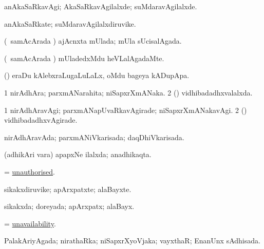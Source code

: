 \bentry
{} 
\gl{\kirxvi}
\expl{}
\bmng
anAkaSaRkavAgi; AkaSaRkavAgilalxde; suMdaravAgilalxde. 
\emng
\eentry

\bentry
{} 
\gl{\nA}
\expl{}
\bmng
anAkaSaRkate; suMdaravAgilalxdiruvike. 
\emng
\eentry

\bentry
{} 
\gl{\gu}
\expl{}
\bmng
(\kanmu\ samAcArada \vi) ajAcnxta mUlada; mUla sUcisalAgada. 
\emng
\eentry

\bentry
{} 
\gl{\kirxvi}
\expl{}
\bmng
(\kanmu\ samAcArada \vi) mUladedxMdu heVLalAgadaMte. 
\emng
\eentry

\bentry
{} 
\gl{\nA}
\expl{}
\bmng
(\pArxvi) eraDu kAlebxraLugaLuLaLx, oMdu bageya kADupApa. 
\emng
\eentry

\bentry
{} 
\gl{\gu}
\expl{}
\bmng
\bnum
\num{1} nirAdhAra; parxmANarahita; niSapxrXmANaka. 
\num{2} (\nAyxshA) vidhibadadhxvalalxda. 
\enum
\emng
\eentry

\bentry
{} 
\gl{\kirxvi}
\expl{}
\bmng
\bnum
\num{1} nirAdhAravAgi; parxmANapUvaRkavAgirade; niSapxrXmANakavAgi. 
\num{2} (\nAyxshA) vidhibadadhxvAgirade. 
\enum
\emng
\eentry

\bentry
{} 
\gl{\gu}
\expl{}
\bmng
nirAdhAravAda; parxmANiVkarisada; daqDhiVkarisada. 
\emng
\eentry

\bentry
{} 
\gl{\gu}
\expl{}
\bmng
(adhikAri \mo vara) apapxNe ilalxda; anadhikaqta. 
\emng
\eentry

\bentry
{} 
\gl{\gu}
\bmng
= \hyperlink{unauthorised}{unauthorised}. 
\emng
\eentry

\bentry
{} 
\gl{\nA}
\expl{}
\bmng
sikakxdiruvike; apArxpatxte; alaBayxte. 
\emng
\eentry

\bentry
{} 
\gl{\gu}
\expl{}
\bmng
sikakxda; doreyada; apArxpatx; alaBayx. 
\emng
\eentry

\bentry
{} 
\gl{\nA}
\expl{}
\bmng
= \hyperlink{unavailability}{unavailability}. 
\emng
\eentry

\bentry
{} 
\gl{\gu}
\expl{}
\bmng
PalakAriyAgada; nirathaRka; niSapxrXyoVjaka; vayxthaR; EnanUnx sAdhisada. 
\emng
\eentry

